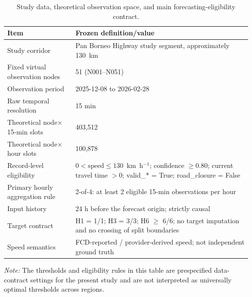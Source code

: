 \documentclass[pdflatex,sn-mathphys-num,iicol]{sn-jnl}
\begin{document}
\begin{table}[t]
\caption{Study data, theoretical observation space, and main forecasting-eligibility contract.}
\label{tab:study-data-contract}
\centering
\renewcommand{\arraystretch}{1.15}
\begin{tabular}{|p{}|p{}|}
\hline
\textbf{Item} & \textbf{Frozen definition/value} \\
\hline

Study corridor
&
Pan Borneo Highway study segment, approximately 130~km
\\
\hline

Fixed virtual observation nodes
&
51 (N001--N051)
\\
\hline

Observation period
&
2025-12-08 to 2026-02-28
\\
\hline

Raw temporal resolution
&
15 min
\\
\hline

Theoretical node$\times$15-min slots
&
403,512
\\
\hline

Theoretical node$\times$hour slots
&
100,878
\\
\hline

Record-level eligibility
&
$0 < \mathrm{speed} \leq 130$~km~h$^{-1}$; confidence $\geq 0.80$; current travel time $> 0$; valid\_* = True; road\_closure = False
\\
\hline

Primary hourly aggregation rule
&
2-of-4: at least 2 eligible 15-min observations per hour
\\
\hline

Input history
&
24 h before the forecast origin; strictly causal
\\
\hline

Target contract
&
H1 = 1/1; H3 = 3/3; H6 $\geq$ 6/6; no target imputation and no crossing of split boundaries
\\
\hline

Speed semantics
&
FCD-reported / provider-derived speed; not independent ground truth
\\
\hline

\end{tabular}

\vspace{2mm}
\begin{flushleft}
\footnotesize
\textit{Note:} The thresholds and eligibility rules in this table are prespecified data-contract settings for the present study and are not interpreted as universally optimal thresholds across regions.
\end{flushleft}
\end{table}
\end{document}
